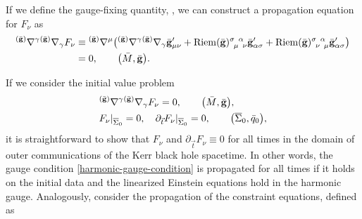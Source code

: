 \documentclass[11pt]{article}
\numberwithin{equation}{section}
\def\ptl{\partial}%
\def\olin#1{\overline{#1}{}}%
\def\grad{{\nabla}}%
\newcommand{\leftexp}[2]{{\vphantom{#2}}^{#1}{#2}}
\def \gm{\gamma}
\def \a{\alpha}
\renewcommand{\gg}{{\bf g}}
\newcommand{\bgg}{{\bar{\bf g}}}
\newcommand{\tgg}{{\tilde{\bf g}}}
\renewcommand{\a}{\alpha}
\numberwithin{equation}{section}
\begin{document}
If we define the gauge-fixing quantity, \smash{$F_\nu = \leftexp{(\bgg)}{\grad}^\mu \tgg'_{ \mu \nu}$}, we can construct a propagation equation for $F_\nu$ as
\begin{align*}
\leftexp{(\bgg)}{\grad}^\gm \leftexp{(\bgg)}{\grad}_\gm F_\nu &{}\equiv \leftexp{(\bgg)}{\grad}^ \mu
\bigl(\leftexp{(\bgg)}{\grad}^\gm \leftexp{(\bar{\gg})}{\grad}_\gm \bgg'_{\mu \nu} + {\rm Riem}(\bgg)^{\sigma \,\,\,\a}_{\,\,\,\mu\,\,\,\nu} \bgg'_{\a \sigma} + {\rm Riem}(\bgg)^{\sigma \,\,\,\a}_{\,\,\,\nu\,\,\,\mu} \bgg'_{\a \sigma}\bigr) \\
&{}= 0, \qquad \bigl(\bar{M}, \bgg\bigr).
\end{align*}

If we consider the initial value problem
\begin{align*}
&\leftexp{(\bgg)}{\grad}^\gm \leftexp{(\bgg)}{\grad}_\gm F_\nu= 0, \qquad \bigl(\bar{M}, \bgg\bigr), \\
&F_\nu \vert_{\olin{\Sigma}_0} =0, \quad \ptl_{\vec{t}} F_\nu \vert_{\olin{\Sigma}_0} =0, \qquad \bigl(\olin{\Sigma}_0, \bar{q}_0\bigr),
\end{align*}
it is straightforward to show that $F_\nu$ and $\ptl_{\vec{t}} F_\nu \equiv 0$ for all times in the domain of outer communications of the Kerr black hole spacetime. In other words, the gauge condition \eqref{harmonic-gauge-condition} is propagated for all times if it holds on the initial data and the linearized Einstein equations hold in the harmonic gauge. Analogously, consider the propagation of the constraint equations, defined as
\end{document}
